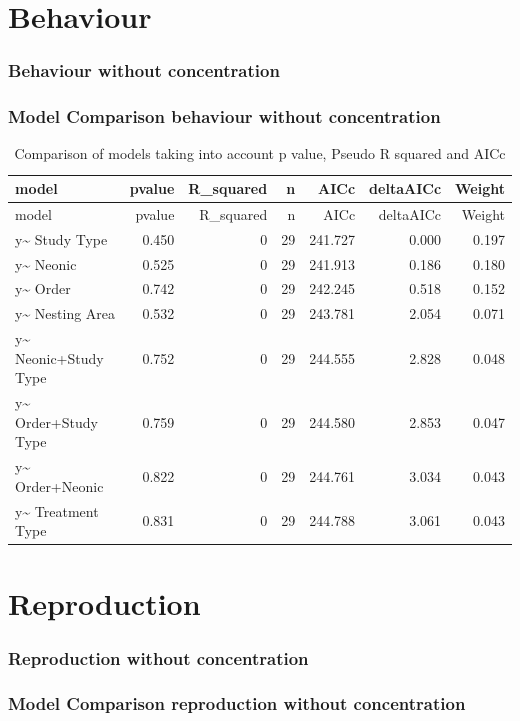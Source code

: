 \documentclass[]{elsarticle} %
\begin{document}
\section{Behaviour}\label{behaviour}

\subsubsection{Behaviour without
concentration}\label{behaviour-without-concentration}

\subsubsection{Model Comparison behaviour without
concentration}\label{model-comparison-behaviour-without-concentration}

\begin{longtable}[c]{@{}lrrrrrr@{}}
\caption{Comparison of models taking into account p value, Pseudo R
squared and AICc}\tabularnewline
\toprule
model & pvalue & R\_squared & n & AICc & deltaAICc &
Weight\tabularnewline
\midrule
\endfirsthead
\toprule
model & pvalue & R\_squared & n & AICc & deltaAICc &
Weight\tabularnewline
\midrule
\endhead
y\textasciitilde{} Study Type & 0.450 & 0 & 29 & 241.727 & 0.000 &
0.197\tabularnewline
y\textasciitilde{} Neonic & 0.525 & 0 & 29 & 241.913 & 0.186 &
0.180\tabularnewline
y\textasciitilde{} Order & 0.742 & 0 & 29 & 242.245 & 0.518 &
0.152\tabularnewline
y\textasciitilde{} Nesting Area & 0.532 & 0 & 29 & 243.781 & 2.054 &
0.071\tabularnewline
y\textasciitilde{} Neonic+Study Type & 0.752 & 0 & 29 & 244.555 & 2.828
& 0.048\tabularnewline
y\textasciitilde{} Order+Study Type & 0.759 & 0 & 29 & 244.580 & 2.853 &
0.047\tabularnewline
y\textasciitilde{} Order+Neonic & 0.822 & 0 & 29 & 244.761 & 3.034 &
0.043\tabularnewline
y\textasciitilde{} Treatment Type & 0.831 & 0 & 29 & 244.788 & 3.061 &
0.043\tabularnewline
\bottomrule
\end{longtable}

\section{Reproduction}\label{reproduction}

\subsubsection{Reproduction without
concentration}\label{reproduction-without-concentration}

\subsubsection{Model Comparison reproduction without
concentration}\label{model-comparison-reproduction-without-concentration}
\end{document}
